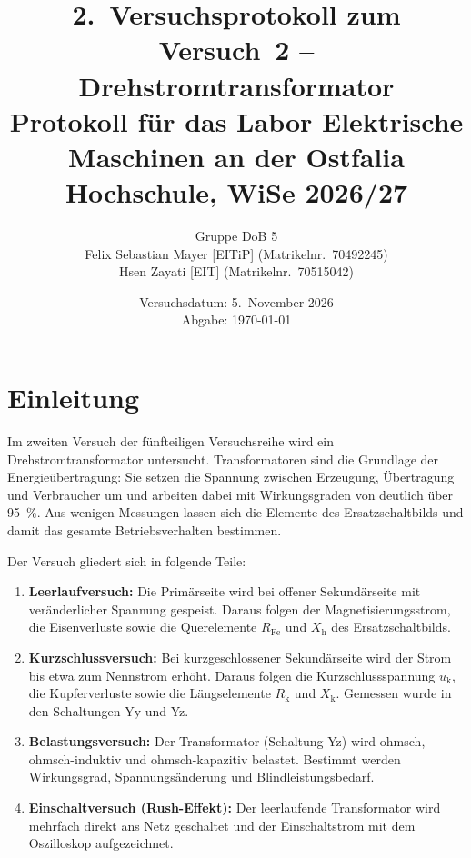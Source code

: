 \documentclass[a4paper,11pt]{scrreprt}
\begin{document}
\title{2.~Versuchsprotokoll zum Versuch~2 -- Drehstromtransformator\\[0.5em]
  \large Protokoll für das Labor Elektrische Maschinen an der Ostfalia Hochschule, WiSe 2026/27}
\author{Gruppe DoB 5\\[0.5em]
  Felix Sebastian Mayer [EITiP] (Matrikelnr.~70492245)\\
  Hsen Zayati [EIT] (Matrikelnr.~70515042)}
\date{Versuchsdatum: 5.~November 2026\\[0.3em] Abgabe: \today}
\maketitle

\tableofcontents

\chapter{Einleitung}

Im zweiten Versuch der fünfteiligen Versuchsreihe wird ein Drehstromtransformator untersucht. Transformatoren sind die Grundlage der Energieübertragung: Sie setzen die Spannung zwischen Erzeugung, Übertragung und Verbraucher um und arbeiten dabei mit Wirkungsgraden von deutlich über \SI{95}{\percent}. Aus wenigen Messungen lassen sich die Elemente des Ersatzschaltbilds und damit das gesamte Betriebsverhalten bestimmen.

Der Versuch gliedert sich in folgende Teile:
\begin{enumerate}[nosep]
  \item \textbf{Leerlaufversuch:} Die Primärseite wird bei offener Sekundärseite mit veränderlicher Spannung gespeist. Daraus folgen der Magnetisierungsstrom, die Eisenverluste sowie die Querelemente $R_\mathrm{Fe}$ und $X_\mathrm{h}$ des Ersatzschaltbilds.
  \item \textbf{Kurzschlussversuch:} Bei kurzgeschlossener Sekundärseite wird der Strom bis etwa zum Nennstrom erhöht. Daraus folgen die Kurzschlussspannung $u_\mathrm{k}$, die Kupferverluste sowie die Längselemente $R_\mathrm{k}$ und $X_\mathrm{k}$. Gemessen wurde in den Schaltungen Yy und Yz.
  \item \textbf{Belastungsversuch:} Der Transformator (Schaltung Yz) wird ohmsch, ohmsch-induktiv und ohmsch-kapazitiv belastet. Bestimmt werden Wirkungsgrad, Spannungsänderung und Blindleistungsbedarf.
  \item \textbf{Einschaltversuch (Rush-Effekt):} Der leerlaufende Transformator wird mehrfach direkt ans Netz geschaltet und der Einschaltstrom mit dem Oszilloskop aufgezeichnet.
\end{enumerate}
\end{document}
